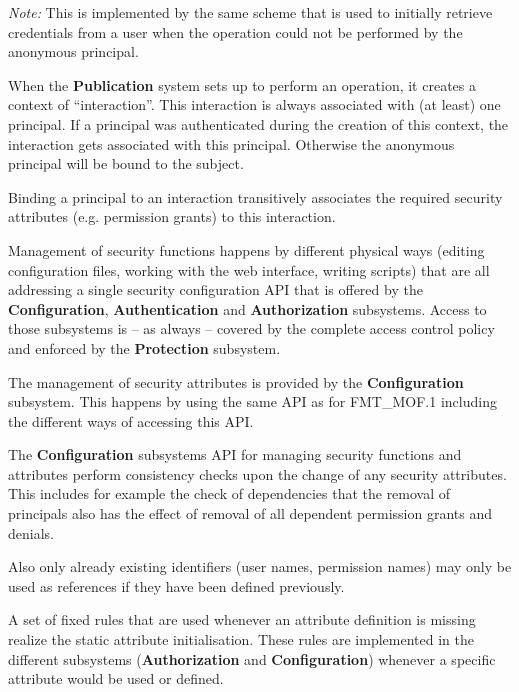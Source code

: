 \documentclass[12pt,english]{scrbook}
\begin{document}
\emph{Note:} This is implemented by the same scheme that is used to initially
retrieve credentials from a user when the operation could not be performed by
the anonymous principal.


When the \textbf{Publication} system sets up to perform an operation, it
creates a context of ``interaction''. This interaction is always associated
with (at least) one principal. If a principal was authenticated during the
creation of this context, the interaction gets associated with this principal.
Otherwise the anonymous principal will be bound to the subject.

Binding a principal to an interaction transitively associates the required security
attributes (e.g. permission grants) to this interaction.


Management of security functions happens by different physical ways (editing
configuration files, working with the web interface, writing scripts) that are
all addressing a single security configuration API that is offered by the
\textbf{Configuration}, \textbf{Authentication} and \textbf{Authorization}
subsystems. Access to those subsystems is -- as always -- covered by the
complete access control policy and enforced by the \textbf{Protection}
subsystem.


The management of security attributes is provided by the \textbf{Configuration}
subsystem. This happens by using the same API as for FMT\_MOF.1 including the
different ways of accessing this API.


The \textbf{Configuration} subsystems API for managing security functions and
attributes perform consistency checks upon the change of any security
attributes. This includes for example the check of dependencies that the
removal of principals also has the effect of removal of all dependent
permission grants and denials. 

Also only already existing identifiers (user names, permission names) may only
be used as references if they have been defined previously.


A set of fixed rules that are used whenever an attribute definition is missing
realize the static attribute initialisation. These rules are implemented in the
different subsystems (\textbf{Authorization} and \textbf{Configuration})
whenever a specific attribute would be used or defined.
\end{document}
